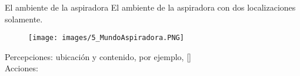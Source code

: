 \begin{frame}{El ambiente de la aspiradora}
El ambiente de la aspiradora con dos localizaciones solamente.
\begin{figure}
    \centering
    \texttt{[image: images/5\_MundoAspiradora.PNG]}
\end{figure}
Percepciones: ubicación y contenido, por ejemplo, [] \\
Acciones: 
\end{frame}